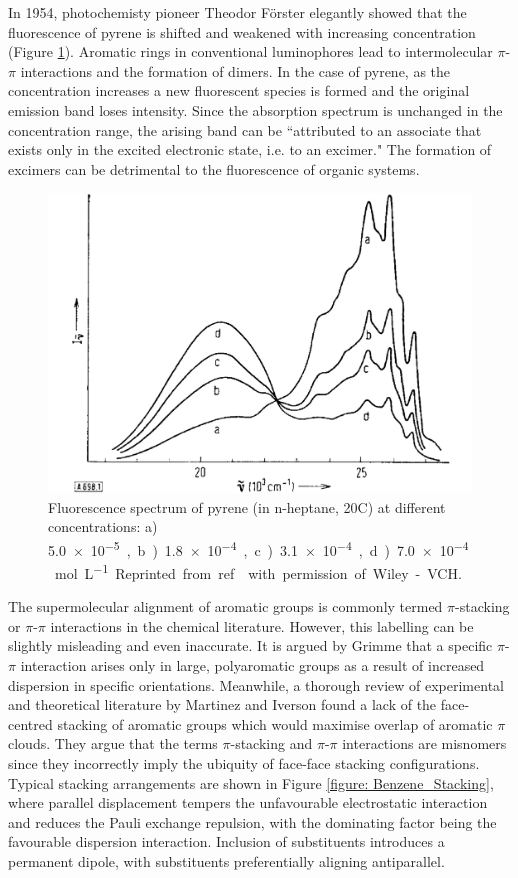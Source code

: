 In 1954, photochemisty pioneer Theodor F\"{o}rster elegantly showed that the fluorescence of pyrene is shifted and weakened with increasing concentration (Figure \ref{figure: Forster_Spectra}).\cite{Forster1954,Forster1969} Aromatic rings in conventional luminophores lead to intermolecular $\pi$-$\pi$ interactions and the formation of dimers. In the case of pyrene, as the concentration increases a new fluorescent species is formed and the original emission band loses intensity. Since the absorption spectrum is unchanged in the concentration range, the arising band can be ``attributed to an associate that exists only in the excited electronic state, i.e. to an excimer."\cite{Forster1969} The formation of excimers can be detrimental to the fluorescence of organic systems.
\begin{figure}[t]
\centering
  \includegraphics[width=0.6\linewidth]{1Intro/Forster_Spectra.pdf}
  \caption[Fluorescence spectrum of pyrene]{Fluorescence spectrum of pyrene (in n-heptane, 20\degree{}C) at different concentrations: a) \SI{5.0e-5}, b) \SI{1.8e-4}, c) \SI{3.1e-4}, d) \SI{7.0e-4}{mol L^{-1}}. Reprinted from ref.~ with permission of Wiley-VCH.}
  \label{figure: Forster_Spectra}
\end{figure}
The supermolecular alignment of aromatic groups is commonly termed $\pi$-stacking or $\pi$-$\pi$ interactions in the chemical literature. However, this labelling can be slightly misleading and even inaccurate.\cite{Grimme2008,Martinez2012} It  is argued by Grimme that a specific $\pi$-$\pi$ interaction arises only in large, polyaromatic groups as a result of increased dispersion in specific orientations.\cite{Grimme2008} Meanwhile, a thorough review of experimental and theoretical literature by Martinez and Iverson found a lack of the face-centred stacking of aromatic groups which would maximise overlap of aromatic $\pi$ clouds.\cite{Martinez2012} They argue that the terms $\pi$-stacking and $\pi$-$\pi$ interactions are misnomers since they incorrectly imply the ubiquity of face-face stacking configurations. Typical stacking arrangements are shown in Figure \ref{figure: Benzene_Stacking}, where parallel displacement tempers the unfavourable electrostatic interaction and reduces the Pauli exchange repulsion, with the dominating factor being the favourable dispersion interaction. Inclusion of substituents introduces a permanent dipole, with substituents preferentially aligning antiparallel.\cite{Martinez2012}

